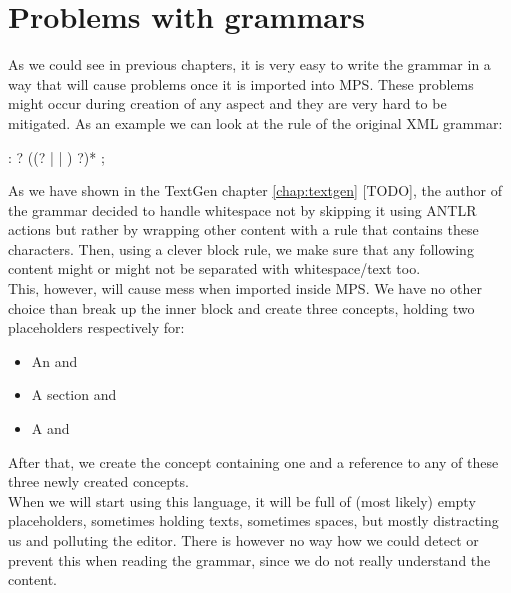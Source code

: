 \chapter{Problems with grammars}

As we could see in previous chapters, it is very easy to write the grammar in a way that will cause problems once it is imported into MPS. These problems might occur during creation of any aspect and they are very hard to be mitigated. As an example we can look at the  rule of the original XML grammar:

\begin{antlr}
	 :   ? ((? |  | ) ?)* ;
\end{antlr}

As we have shown in the TextGen chapter \ref{chap:textgen} [TODO], the author of the grammar decided to handle whitespace not by skipping it using ANTLR actions but rather by wrapping other content with a rule that contains these characters. Then, using a clever block rule, we make sure that any following content might or might not be separated with whitespace/text too. 
\\

This, however, will cause mess when imported inside MPS. We have no other choice than break up the inner block and create three concepts, holding two placeholders respectively for:

\begin{itemize}
	\item An  and 
	\item A  section and 
	\item A  and 
\end{itemize}

After that, we create the  concept containing one  and a reference to any of these three newly created concepts.
\\

When we will start using this language, it will be full of (most likely) empty  placeholders, sometimes holding texts, sometimes spaces, but mostly distracting us and polluting the editor. There is however no way how we could detect or prevent this when reading the grammar, since we do not really understand the content. 
\\

